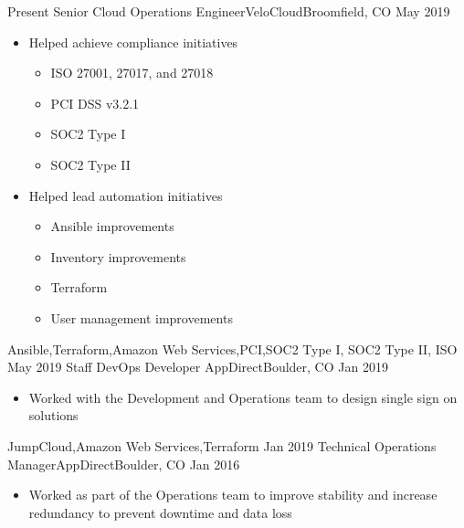 \begin{experiences}
  \experience
    {Present}       {Senior Cloud Operations Engineer}{VeloCloud}{Broomfield, CO}
    {May 2019}      {
                      \begin{itemize}
                        \item Helped achieve compliance initiatives
                        \begin{itemize}
			  \item ISO 27001, 27017, and 27018
                          \item PCI DSS v3.2.1
                          \item SOC2 Type I
                          \item SOC2 Type II
                        \end{itemize}
                        \item Helped lead automation initiatives
                        \begin{itemize}
                          \item Ansible improvements
                          \item Inventory improvements
                          \item Terraform
                          \item User management improvements
                        \end{itemize}
                      \end{itemize}
                    }
                    {Ansible,Terraform,Amazon Web Services,PCI,SOC2 Type I, SOC2 Type II, ISO}
  \emptySeparator
  \experience
    {May 2019}      {Staff DevOps Developer }{AppDirect}{Boulder, CO}
    {Jan 2019}      {
                      \begin{itemize}
                        \item Worked with the Development and Operations team to design single sign on solutions
                      \end{itemize}
                    }
                    {JumpCloud,Amazon Web Services,Terraform}
  \emptySeparator
  \experience
    {Jan 2019}      {Technical Operations Manager}{AppDirect}{Boulder, CO}
    {Jan 2016}      {
                      \begin{itemize}
                        \item Worked as part of the Operations team to improve stability and increase redundancy to prevent downtime and data loss

\end{itemize}}
\end{experiences}
